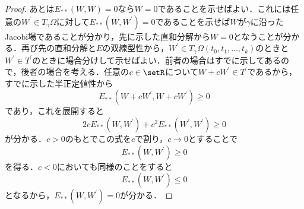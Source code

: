 \documentclass[uplatex]{jsarticle}
\begin{document}
\begin{proof}
あとは$E_{\ast\ast}(W,W)=0$なら$W=0$であることを示せばよい．これには任意の$W^\prime\in T_\gamma \Omega$に対して$E_{\ast\ast}(W,W^\prime)=0$であることを示せば$W$が$\gamma$に沿ったJacobi場であることが分かり，先に示した直和分解から$W=0$となうことが分かる．再び先の直和分解と$E$の双線型性から，$W^\prime\in T_\gamma \Omega(t_0,t_1,\dots ,t_k)$のときと$W^\prime\in T^\prime$のときに場合分けして示せばよい．前者の場合はすでに示してあるので，後者の場合を考える．任意の$c\in \setR$について$W+cW^\prime \in T^\prime$であるから，すでに示した半正定値性から
\[ E_{\ast\ast}(W+cW^\prime,W+cW^\prime) \geq 0 \]
であり，これを展開すると
\[ 2cE_{\ast\ast}(W,W^\prime)+c^2E_{\ast\ast}(W^\prime,W^\prime) \geq 0 \]
が分かる．$c>0$のもとでこの式を$c$で割り，$c \to 0$とすることで
\[ E_{\ast\ast}(W,W^\prime)\geq 0 \]
を得る．$c<0$においても同様のことをすると
\[ E_{\ast\ast}(W,W^\prime)\leq 0 \]
となるから，$E_{\ast\ast}(W,W^\prime) = 0$が分かる．
\end{proof}
\end{document}
